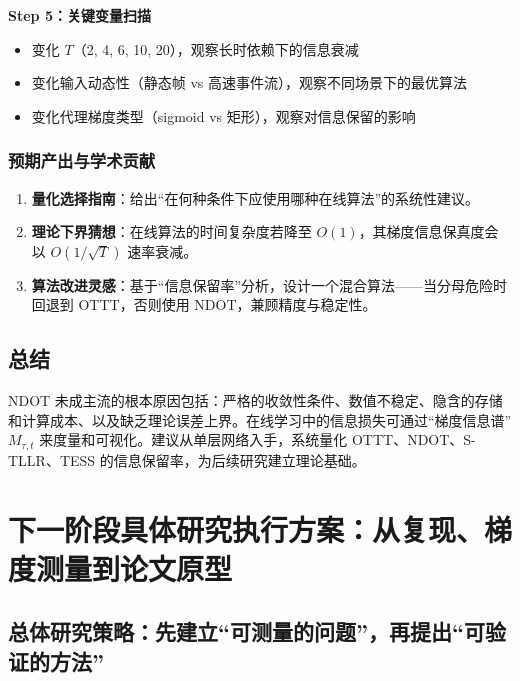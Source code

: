 \documentclass[journal,12pt,onecolumn]{IEEEtran}
\begin{document}
\textbf{Step 5：关键变量扫描}
\begin{itemize}
    \item 变化 \(T\)（2, 4, 6, 10, 20），观察长时依赖下的信息衰减
    \item 变化输入动态性（静态帧 vs 高速事件流），观察不同场景下的最优算法
    \item 变化代理梯度类型（sigmoid vs 矩形），观察对信息保留的影响
\end{itemize}

\subsubsection{预期产出与学术贡献}

\begin{enumerate}
    \item \textbf{量化选择指南}：给出“在何种条件下应使用哪种在线算法”的系统性建议。
    \item \textbf{理论下界猜想}：在线算法的时间复杂度若降至 \(O(1)\)，其梯度信息保真度会以 \(O(1/\sqrt{T})\) 速率衰减。
    \item \textbf{算法改进灵感}：基于“信息保留率”分析，设计一个混合算法——当分母危险时回退到 OTTT，否则使用 NDOT，兼顾精度与稳定性。
\end{enumerate}

\subsection{总结}

NDOT 未成主流的根本原因包括：严格的收敛性条件、数值不稳定、隐含的存储和计算成本、以及缺乏理论误差上界。在线学习中的信息损失可通过“梯度信息谱” \(M_{\tau,t}\) 来度量和可视化。建议从单层网络入手，系统量化 OTTT、NDOT、S-TLLR、TESS 的信息保留率，为后续研究建立理论基础。




\section{下一阶段具体研究执行方案：从复现、梯度测量到论文原型}

\subsection{总体研究策略：先建立“可测量的问题”，再提出“可验证的方法”}
\end{document}
